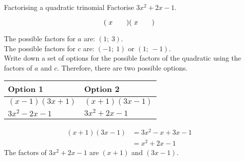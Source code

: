 \begin{wex}
{Factorising a quadratic trinomial}
{Factorise $3{x}^{2}+2x-1$.} 
{
\begin{equation*}
(\ x\phantom{\rule{2.em}{0ex}})(\ x\phantom{\rule{2.em}{0ex}})
\end{equation*}

The possible factors for $a$ are: $(1;~3)$.\\
The possible factors for $c$ are: $(-1;~1)$ or $(1;~-1)$.\\
Write down a set of options for the possible factors of the quadratic using the factors of $a$ and $c$.
Therefore, there are two possible options.\par 

\begin{table}[H]
\begin{center}
\noindent

\begin{tabular}{|l|l|}\hline
\textbf{Option 1} &
\textbf{Option 2}%
\\ \hline
$(x-1)(3x+1)$
&
$(x+1)(3x-1)$
\\ \hline
$3{x}^{2}-2x-1$
&
\uline{$3{x}^{2}+2x-1$}
\\ \hline
\end{tabular}
\end{center}
\end{table}

\begin{align*}
  (x+1)(3x-1) &= 3{x}^{2}-x+3x-1 \\
  &= {x}^{2}+2x-1
\end{align*}
The factors of $3{x}^{2}+2x-1$ are $(x+1)$ and $(3x-1)$.
}
\end{wex}


